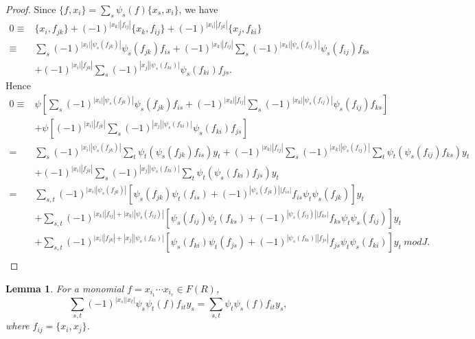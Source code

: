 \documentclass[a4paper,10pt]{amsart}
\newtheorem{lemma}[theorem]{Lemma}
\theoremstyle{definition}
\theoremstyle{remark}
\numberwithin{equation}{section}
\begin{document}
\begin{proof}
Since $\{f, x_i\}=\sum_{s}\psi_{s}(f)\{x_s, x_i\}$, we have
\begin{equation}
\begin{split}
0\equiv&\{x_i, f_{jk}\}+(-1)^{|x_k||f_{ij}|}\{x_k, f_{ij}\}+(-1)^{|x_i||f_{jk}|}\{x_j, f_{ki}\}\\
\equiv&\sum_{s}(-1)^{|x_i||\psi_{s}(f_{jk})|}\psi_{s}(f_{jk})f_{is}+(-1)^{|x_k||f_{ij}|}
\sum_{s}(-1)^{|x_k||\psi_{s}(f_{ij})|}\psi_{s}(f_{ij})f_{ks}\\
&+(-1)^{|x_i||f_{jk}|}\sum_{s}(-1)^{|x_j||\psi_{s}(f_{ki})|}\psi_{s}(f_{ki})f_{js}.
\end{split}\nonumber
\end{equation}
Hence
\begin{equation}
\begin{split}
0\equiv&\psi[\sum_{s}(-1)^{|x_i||\psi_{s}(f_{jk})|}\psi_{s}(f_{jk})f_{is}+(-1)^{|x_k||f_{ij}|}
\sum_{s}(-1)^{|x_k||\psi_{s}(f_{ij})|}\psi_{s}(f_{ij})f_{ks}]\\
&+\psi[(-1)^{|x_i||f_{jk}|}\sum_{s}(-1)^{|x_j||\psi_{s}(f_{ki})|}\psi_{s}(f_{ki})f_{js}]\\
=&\sum_{s}(-1)^{|x_i||\psi_{s}(f_{jk})|}\sum_{t}\psi_{t}(\psi_{s}(f_{jk})f_{is})y_t+(-1)^{|x_k||f_{ij}|}
\sum_{s}(-1)^{|x_k||\psi_{s}(f_{ij})|}\sum_{t}\psi_{t}(\psi_{s}(f_{ij})f_{ks})y_t\\
&+(-1)^{|x_i||f_{jk}|}\sum_{s}(-1)^{|x_j||\psi_{s}(f_{ki})|}\sum_{t}\psi_{t}(\psi_{s}(f_{ki})f_{js})y_t\\
=&\sum_{s,
t}(-1)^{|x_i||\psi_{s}(f_{jk})|}[\psi_{s}(f_{jk})\psi_{t}(f_{is})+(-1)^{|\psi_{s}(f_{jk})||f_{is}|}f_{is}\psi_{t}\psi_{s}(f_{jk})]y_t\\
&+\sum_{s,
t}(-1)^{|x_k||f_{ij}|+|x_k||\psi_{s}(f_{ij})|}[\psi_{s}(f_{ij})\psi_{t}(f_{ks})+(-1)^{|\psi_{s}(f_{ij})||f_{ks}|}f_{ks}\psi_{t}\psi_{s}(f_{ij})]y_t\\
&+\sum_{s,
t}(-1)^{|x_i||f_{jk}|+|x_j||\psi_{s}(f_{ki})|}[\psi_{s}(f_{ki})\psi_{t}(f_{js})+(-1)^{|\psi_{s}(f_{ki})||f_{js}|}f_{js}\psi_{t}\psi_{s}(f_{ki})]y_t ~mod J.\\
\end{split}\nonumber
\end{equation}
\end{proof}

\begin{lemma}\label{lem+}
For a monomial $f=x_{i_1}\cdots x_{i_r}\in F(R)$,
\[\sum_{s,
t}(-1)^{|x_s||x_t|}\psi_{s}\psi_{t}(f)f_{it}y_s=\sum_{s,
t}\psi_{t}\psi_{s}(f)f_{it}y_s,\]
where $f_{ij}=\{x_i, x_j\}$.
\end{lemma}
\end{document}

